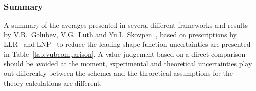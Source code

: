 \subsubsection{Summary}
A summary of the averages presented in several different
frameworks and results by V.B.~Golubev, V.G.~Luth and Yu.I.~Skovpen~\cite{Golubev:2007cs},
based on prescriptions by LLR~\cite{Leibovich:1999xf} and LNP~\cite{Lange:2005qn} 
to reduce the leading shape function uncertainties are presented in 
Table~\ref{tab:vubcomparison}.
A value judgement based on a direct comparison should be
avoided at the moment, experimental and theoretical uncertainties play out
differently between the schemes and the theoretical assumptions for the
theory calculations are different.


